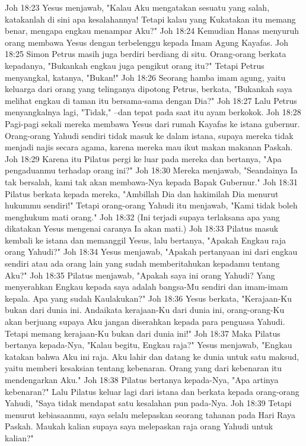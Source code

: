 Joh 18:23  Yesus menjawab, "Kalau Aku mengatakan sesuatu yang salah, katakanlah di sini apa kesalahannya! Tetapi kalau yang Kukatakan itu memang benar, mengapa engkau menampar Aku?"
Joh 18:24  Kemudian Hanas menyuruh orang membawa Yesus dengan terbelenggu kepada Imam Agung Kayafas.
Joh 18:25  Simon Petrus masih juga berdiri berdiang di situ. Orang-orang berkata kepadanya, "Bukankah engkau juga pengikut orang itu?" Tetapi Petrus menyangkal, katanya, "Bukan!"
Joh 18:26  Seorang hamba imam agung, yaitu keluarga dari orang yang telinganya dipotong Petrus, berkata, "Bukankah saya melihat engkau di taman itu bersama-sama dengan Dia?"
Joh 18:27  Lalu Petrus menyangkalnya lagi, "Tidak," --dan tepat pada saat itu ayam berkokok.
Joh 18:28  Pagi-pagi sekali mereka membawa Yesus dari rumah Kayafas ke istana gubernur. Orang-orang Yahudi sendiri tidak masuk ke dalam istana, supaya mereka tidak menjadi najis secara agama, karena mereka mau ikut makan makanan Paskah.
Joh 18:29  Karena itu Pilatus pergi ke luar pada mereka dan bertanya, "Apa pengaduanmu terhadap orang ini?"
Joh 18:30  Mereka menjawab, "Seandainya Ia tak bersalah, kami tak akan membawa-Nya kepada Bapak Gubernur."
Joh 18:31  Pilatus berkata kepada mereka, "Ambillah Dia dan hakimilah Dia menurut hukummu sendiri!" Tetapi orang-orang Yahudi itu menjawab, "Kami tidak boleh menghukum mati orang."
Joh 18:32  (Ini terjadi supaya terlaksana apa yang dikatakan Yesus mengenai caranya Ia akan mati.)
Joh 18:33  Pilatus masuk kembali ke istana dan memanggil Yesus, lalu bertanya, "Apakah Engkau raja orang Yahudi?"
Joh 18:34  Yesus menjawab, "Apakah pertanyaan ini dari engkau sendiri atau ada orang lain yang sudah memberitahukan kepadamu tentang Aku?"
Joh 18:35  Pilatus menjawab, "Apakah saya ini orang Yahudi? Yang menyerahkan Engkau kepada saya adalah bangsa-Mu sendiri dan imam-imam kepala. Apa yang sudah Kaulakukan?"
Joh 18:36  Yesus berkata, "Kerajaan-Ku bukan dari dunia ini. Andaikata kerajaan-Ku dari dunia ini, orang-orang-Ku akan berjuang supaya Aku jangan diserahkan kepada para penguasa Yahudi. Tetapi memang kerajaan-Ku bukan dari dunia ini!"
Joh 18:37  Maka Pilatus bertanya kepada-Nya, "Kalau begitu, Engkau raja?" Yesus menjawab, "Engkau katakan bahwa Aku ini raja. Aku lahir dan datang ke dunia untuk satu maksud, yaitu memberi kesaksian tentang kebenaran. Orang yang dari kebenaran itu mendengarkan Aku."
Joh 18:38  Pilatus bertanya kepada-Nya, "Apa artinya kebenaran?" Lalu Pilatus keluar lagi dari istana dan berkata kepada orang-orang Yahudi, "Saya tidak mendapat satu kesalahan pun pada-Nya.
Joh 18:39  Tetapi menurut kebiasaanmu, saya selalu melepaskan seorang tahanan pada Hari Raya Paskah. Maukah kalian supaya saya melepaskan raja orang Yahudi untuk kalian?"
